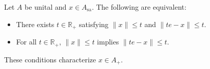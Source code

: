 Let $A$ be unital and $x \in A_{\mathrm{sa}}$. The following are equivalent:
\begin{itemize}
\item[(i)] There exists $t \in \mathbb{R}_+$ satisfying $\|x\| \leq t$ and $\|te - x\| \leq t$.
\item[(ii)] For all $t \in \mathbb{R}_+$, $\|x\| \leq t$ implies $\|te - x\| \leq t$.
\end{itemize}
These conditions characterize $x \in A_+$.
